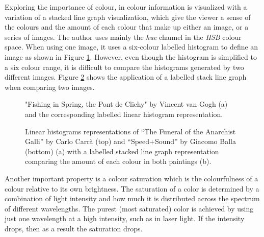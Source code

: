 Exploring the importance of colour, in \cite{haber2011colourvis} colour information is visualized with a variation of a stacked line graph visualization, which give the viewer a sense of the colours and the amount of each colour that make up either an image, or a series of images. The author uses mainly the \emph{hue} channel in the \emph{HSB} colour space. When using one image, it uses a six-colour labelled histogram to define an image as shown in Figure \ref{fig:colourvis1}. However, even though the histogram is simplified to a six colour range, it is difficult to compare the histograms generated by two different images. Figure \ref{fig:colourvis2} shows the application of a labelled stack line graph when comparing two images.

\begin{figure}[htbp]
	\centering
  \caption{"Fishing in Spring, the Pont de Clichy" by Vincent van Gogh (a) and the corresponding labelled linear histogram representation.}
  \label{fig:colourvis1}
\end{figure}


\begin{figure}[htb]
	\centering
  \caption{Linear histograms representations of “The Funeral of the Anarchist Galli” by Carlo Carrà (top) and “Speed+Sound” by Giacomo Balla (bottom) (a) with a labelled stacked line graph representation comparing the amount of each colour in both paintings (b).}
  \label{fig:colourvis2}
\end{figure}

Another important property is a colour saturation which is the colourfulness of a colour relative to its own brightness. The saturation of a color is determined by a combination of light intensity and how much it is distributed across the spectrum of different wavelengths. The purest (most saturated) color is achieved by using just one wavelength at a high intensity, such as in laser light. If the intensity drops, then as a result the saturation drops.

